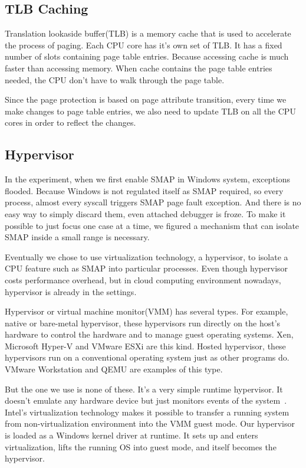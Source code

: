 \subsection{TLB Caching}

Translation lookaside buffer(TLB) is a memory cache that is used to accelerate the process of paging. Each CPU core has it's own set of TLB. It has a fixed number of slots containing page table entries. Because accessing cache is much faster than accessing memory. When cache contains the page table entries needed, the CPU don't have to walk through the page table.

Since the page protection is based on page attribute transition, every time we make changes to page table entries, we also need to update TLB on all the CPU cores in order to reflect the changes. 

\subsection{Hypervisor}

In the experiment, when we first enable SMAP in Windows system, exceptions flooded. Because Windows is not regulated itself as SMAP required, so every process, almost every syscall triggers SMAP page fault exception. And there is no easy way to simply discard them, even attached debugger is froze. To make it possible to just focus one case at a time, we figured a mechanism that can isolate SMAP inside a small range is necessary.

Eventually we chose to use virtualization technology, a hypervisor, to isolate a CPU feature such as SMAP into particular processes. Even though hypervisor costs performance overhead, but in cloud computing environment nowadays, hypervisor is already in the settings.

Hypervisor or virtual machine monitor(VMM) has several types. For example, native or bare-metal hypervisor, these hypervisors run directly on the host's hardware to control the hardware and to manage guest operating systems. Xen, Microsoft Hyper-V and VMware ESXi are this kind. Hosted hypervisor, these hypervisors run on a conventional operating system just as other programs do. VMware Workstation and QEMU are examples of this type.

But the one we use is none of these. It's a very simple runtime hypervisor. It doesn't emulate any hardware device but just monitors events of the system~\cite{howtohide}. Intel's virtualization technology makes it possible to transfer a running system from non-virtualization environment into the VMM guest mode. Our hypervisor is loaded as a Windows kernel driver at runtime. It sets up and enters virtualization, lifts the running OS into guest mode, and itself becomes the hypervisor.  

